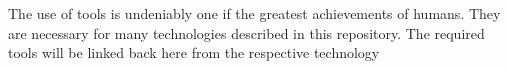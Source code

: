The use of tools is undeniably one if the greatest achievements of humans. They are necessary for many technologies described in this repository. The required tools will be linked back here from the respective technology 
